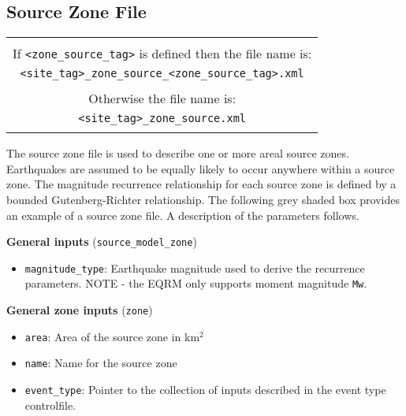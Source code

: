 \subsection{Source Zone File}
\label{sec:source-zone-file}


\begin{center}
\begin{tabular}{|c|}
\hline
 \\
 If \texttt{<zone\_source\_tag>} is defined then the file name is:\\
\texttt{<site\_tag>\_}\texttt{zone\_source\_}\texttt{<zone\_source\_tag>}\texttt{.xml}
\\
\\
Otherwise the file name is:\\
\texttt{<site\_tag>\_}\texttt{zone\_source}\texttt{.xml}\\
\\
\hline
\end{tabular}
\end{center}

The source zone file is used to describe one or more areal source
zones. Earthquakes are assumed to be equally likely to occur
anywhere within a source zone. The magnitude recurrence relationship
for each source zone is defined by a bounded Gutenberg-Richter
relationship. The following grey shaded box provides an example of a
source zone file. A description of the parameters follows.
%


\textbf{General inputs} (\texttt{source\_model\_zone})
\begin{itemize}
\item \texttt{magnitude\_type}: Earthquake magnitude used to derive the
recurrence parameters. NOTE - the EQRM only supports moment magnitude
\texttt{Mw}.
\end{itemize}

\textbf{General zone inputs} (\texttt{zone})
\begin{itemize}
\item \texttt{area}: Area of the source zone in km$^2$
\item \texttt{name}: Name for the source zone
\item \texttt{event\_type}: Pointer to the collection of inputs described in the
event type controlfile.
\end{itemize}

